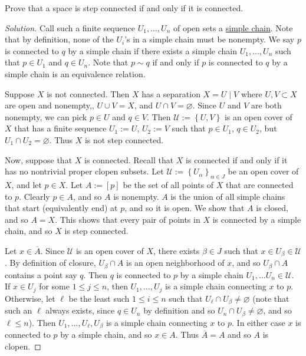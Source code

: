 \documentclass[12pt]{article}
\newcommand\setb[1]{\left \{ #1 \right \}}
\theoremstyle{definition}
\begin{document}
Prove that a space is step connected if and only if it is connected.
\begin{proof}[Solution]
    Call such a finite sequence $U_1 , \dotsc, U_n$ of open sets a \underline{simple chain}. Note that by definition, none of the $U_i$'s in a simple chain must be nonempty. We say $p$ is connected to $q$ by a simple chain if there exists a simple chain $U_1 , \dotsc , U_n$ such that $p \in U_1$ and $q \in U_n$. Note that $p \sim q$ if and only if $p$ is connected to $q$ by a simple chain is an equivalence relation.
    
    Suppose $X$ is not connected. Then $X$ has a separation $X = U \mid V$ where $U , V \subset X$ are open and nonempty,, $U \cup V = X$, and $U \cap V = \varnothing$. Since $U$ and $V$ are both nonempty, we can pick $p \in U$ and $q \in V$. Then $\mathcal{U} := \setb{ U , V }$ is an open cover of $X$ that has a finite sequence $U_1 := U$, $U_2 := V$ such that $p \in U_1$, $q \in U_2$, but $U_1 \cap U_2 = \varnothing$. Thus $X$ is not step connected.
    
    Now, suppose that $X$ is connected. Recall that $X$ is connected if and only if it has no nontrivial proper clopen subsets. Let $\mathcal{U} := \setb{ U_{\alpha} }_{\alpha \in J}$ be an open cover of $X$, and let $p \in X$. Let $A := [p]$ be the set of all points of $X$ that are connected to $p$. Clearly $p \in A$, and so $A$ is nonempty. $A$ is the union of all simple chains that start (equivalently end) at $p$, and so it is open. We show that $A$ is closed, and so $A = X$. This shows that every pair of points in $X$ is connected by a simple chain, and so $X$ is step connected.
    
    Let $x \in \overline{A}$. Since $\mathcal{U}$ is an open cover of $X$, there exists $\beta \in J$ such that $x \in U_{\beta} \in \mathcal{U}$. By definition of closure, $U_{\beta} \cap A$ is an open neighborhood of $x$, and so $U_{\beta} \cap A$ contains a point say $q$. Then $q$ is connected to $p$ by a simple chain $U_1 , \dotsc U_n \in \mathcal{U}$. If $x \in U_j$ for some $1 \leq j \leq n$, then $U_1 , \dotsc , U_j$ is a simple chain connecting $x$ to $p$. Otherwise, let $\ell$ be the least such $1 \leq i \leq n$ such that $U_{\ell} \cap U_{\beta} \neq \varnothing$ (note that such an $\ell$ always exists, since $q \in U_n$ by definition and so $U_n \cap U_{\beta} \neq \varnothing$, and so $\ell \leq n$). Then $U_1 , \dotsc , U_{\ell} , U_{\beta}$ is a simple chain connecting $x$ to $p$. In either case $x$ is connected to $p$ by a simple chain, and so $x \in A$. Thus $\overline{A} = A$ and so $A$ is clopen.
\end{proof}
\end{document}
